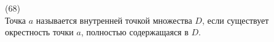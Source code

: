 (68)\\
Точка $a$ называется внутренней точкой множества $D$, если существует окрестность точки $a$, полностью содержащаяся в $D$.\\